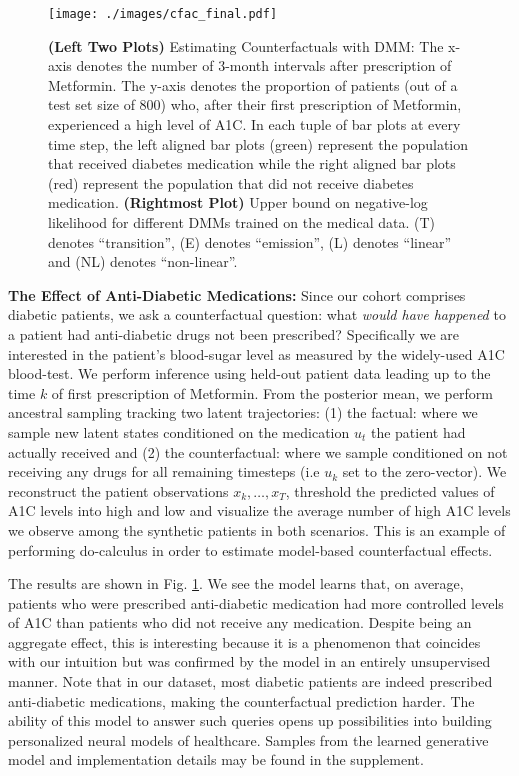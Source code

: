 \documentclass[letterpaper]{article}
\theoremstyle{plain}
\newcommand{\DKF}{DMM\xspace}
\begin{document}
{\begin{figure}[t!]
	\centering
	\texttt{[image: ./images/cfac\_final.pdf]}
	\caption{\small {\bf (Left Two Plots) } 
	Estimating Counterfactuals with \DKF:  The x-axis denotes the number of $3$-month intervals after prescription of Metformin. 
		The y-axis denotes the proportion of patients (out of a test set size of $800$) who, after their first prescription of Metformin, experienced
	a high level of A1C. In each tuple of bar plots at every time step, the left aligned bar plots (green) represent the population that received diabetes
medication while the right aligned bar plots (red) represent the population that did not receive diabetes medication.
{\bf (Rightmost Plot) } Upper bound on negative-log likelihood for different DMMs trained on the medical data. (T) denotes ``transition'', (E) denotes ``emission'', (L) denotes ``linear'' and (NL) denotes ``non-linear''. 
}
	\label{fig:cfac}
\end{figure}
\textbf{The Effect of Anti-Diabetic Medications: } 
Since our cohort comprises diabetic patients, we ask a counterfactual question: what \emph{would 
have happened} to a patient had anti-diabetic drugs not been prescribed? Specifically we are interested in the patient's blood-sugar level as measured by the widely-used A1C blood-test.
We perform inference using held-out patient data leading up to the time $k$ of first prescription of Metformin.
From the posterior mean, we perform ancestral sampling tracking two latent trajectories: 
(1) the factual: where we sample new latent states conditioned 
on the medication $u_t$ the patient had actually received and 
(2) the counterfactual: where we sample conditioned on 
not receiving any drugs for all remaining timesteps (i.e $u_k$ set to the zero-vector). 
We reconstruct the patient observations $x_k,\ldots,x_T$, threshold
the predicted values of A1C levels into high and low and visualize the average number of high A1C levels 
we observe among the synthetic patients in both scenarios. 
This is an example of performing do-calculus \cite{pearl2009causality} in order to estimate model-based counterfactual effects.

The results are shown in Fig. \ref{fig:cfac}. We see the model learns that, on average, patients who were prescribed anti-diabetic medication
had more controlled levels of A1C than patients who did not receive any medication.  
Despite being an aggregate effect, this is interesting because it is a phenomenon that coincides with our intuition
but was confirmed by the model in an entirely unsupervised manner. Note that in our dataset, most diabetic patients are indeed prescribed anti-diabetic medications, making the counterfactual prediction harder. The ability of this model to answer such
queries opens up possibilities into building personalized neural models of healthcare. 
Samples from the learned generative model
and implementation details may be found in the supplement. 

}
\end{document}

